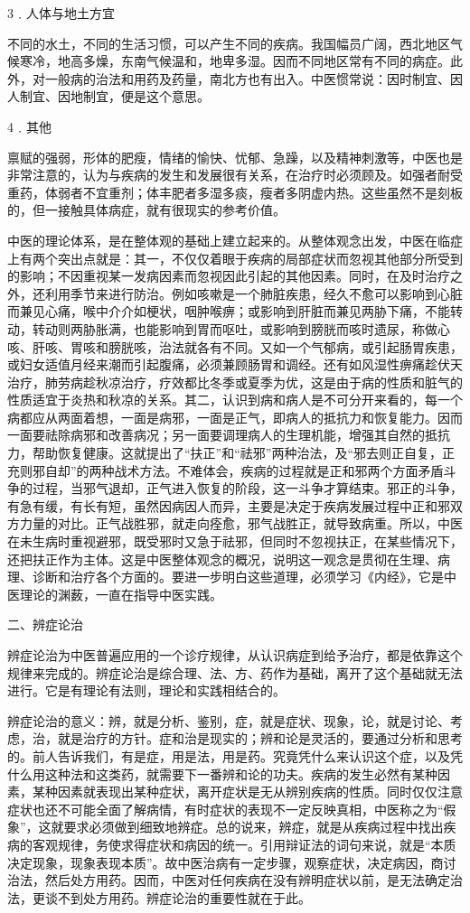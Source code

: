 \documentclass[12pt,UTF8]{ctexbook}
\begin{document}
3﹒人体与地土方宜

不同的水土，不同的生活习惯，可以产生不同的疾病。我国幅员广阔，西北地区气候寒冷，地高多燥，东南气候温和，地卑多湿。因而不同地区常有不同的病症。此外，对一般病的治法和用药及药量，南北方也有出入。中医惯常说：因时制宜、因人制宜、因地制宜，便是这个意思。

4﹒其他

禀赋的强弱，形体的肥瘦，情绪的愉快、忧郁、急躁，以及精神刺激等，中医也是非常注意的，认为与疾病的发生和发展很有关系，在治疗时必须顾及。如强者耐受重药，体弱者不宜重剂；体丰肥者多湿多痰，瘦者多阴虚内热。这些虽然不是刻板的，但一接触具体病症，就有很现实的参考价值。

中医的理论体系，是在整体观的基础上建立起来的。从整体观念出发，中医在临症上有两个突出点就是：其一，不仅仅着眼于疾病的局部症状而忽视其他部分所受到的影响；不因重视某一发病因素而忽视因此引起的其他因素。同时，在及时治疗之外，还利用季节来进行防治。例如咳嗽是一个肺脏疾患，经久不愈可以影响到心脏而兼见心痛，喉中介介如梗状，咽肿喉痹；或影响到肝脏而兼见两胁下痛，不能转动，转动则两胁胀满，也能影响到胃而呕吐，或影响到膀胱而咳时遗尿，称做心咳、肝咳、胃咳和膀胱咳，治法就各有不同。又如一个气郁病，或引起肠胃疾患，或妇女适值月经来潮而引起腹痛，必须兼顾肠胃和调经。还有如风湿性痹痛趁伏天治疗，肺劳病趁秋凉治疗，疗效都比冬季或夏季为优，这是由于病的性质和脏气的性质适宜于炎热和秋凉的关系。其二，认识到病和病人是不可分开来看的，每一个病都应从两面着想，一面是病邪，一面是正气，即病人的抵抗力和恢复能力。因而一面要祛除病邪和改善病况；另一面要调理病人的生理机能，增强其自然的抵抗力，帮助恢复健康。这就提出了“扶正”和“祛邪”两种治法，及“邪去则正自复，正充则邪自却”的两种战术方法。不难体会，疾病的过程就是正和邪两个方面矛盾斗争的过程，当邪气退却，正气进入恢复的阶段，这一斗争才算结束。邪正的斗争，有急有缓，有长有短，虽然因病因人而异，主要是决定于疾病发展过程中正和邪双方力量的对比。正气战胜邪，就走向痊愈，邪气战胜正，就导致病重。所以，中医在未生病时重视避邪，既受邪时又急于祛邪，但同时不忽视扶正，在某些情况下，还把扶正作为主体。这是中医整体观念的概况，说明这一观念是贯彻在生理、病理、诊断和治疗各个方面的。要进一步明白这些道理，必须学习《内经》，它是中医理论的渊薮，一直在指导中医实践。

二、辨症论治

辨症论治为中医普遍应用的一个诊疗规律，从认识病症到给予治疗，都是依靠这个规律来完成的。辨症论治是综合理、法、方、药作为基础，离开了这个基础就无法进行。它是有理论有法则，理论和实践相结合的。

辨症论治的意义：辨，就是分析、鉴别，症，就是症状、现象，论，就是讨论、考虑，治，就是治疗的方针。症和治是现实的；辨和论是灵活的，要通过分析和思考的。前人告诉我们，有是症，用是法，用是药。究竟凭什么来认识这个症，以及凭什么用这种法和这类药，就需要下一番辨和论的功夫。疾病的发生必然有某种因素，某种因素就表现出某种症状，离开症状是无从辨别疾病的性质。同时仅仅注意症状也还不可能全面了解病情，有时症状的表现不一定反映真相，中医称之为“假象”，这就要求必须做到细致地辨症。总的说来，辨症，就是从疾病过程中找出疾病的客观规律，务使求得症状和病因的统一。引用辩证法的词句来说，就是“本质决定现象，现象表现本质”。故中医治病有一定步骤，观察症状，决定病因，商讨治法，然后处方用药。因而，中医对任何疾病在没有辨明症状以前，是无法确定治法，更谈不到处方用药。辨症论治的重要性就在于此。
\end{document}
